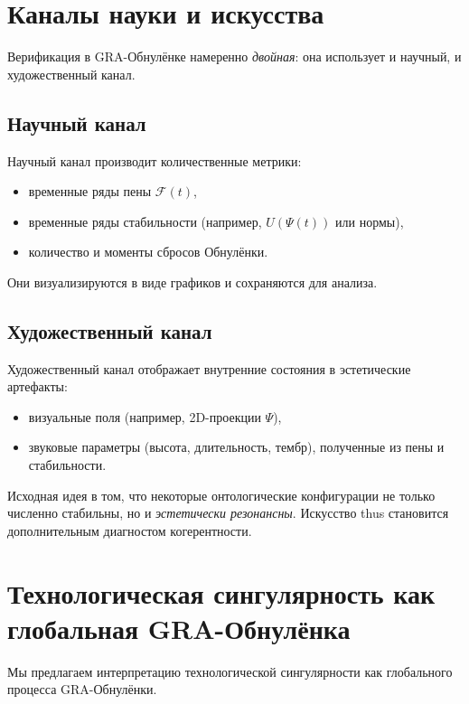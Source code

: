 \documentclass[11pt,a4paper]{article}
\begin{document}
\section{Каналы науки и искусства}
Верификация в GRA-Обнулёнке намеренно \emph{двойная}:
она использует и научный, и художественный канал.

\subsection{Научный канал}
Научный канал производит количественные метрики:
\begin{itemize}
  \item временные ряды пены $\mathcal{F}(t)$,
  \item временные ряды стабильности
        (например, $U(\Psi(t))$ или нормы),
  \item количество и моменты сбросов Обнулёнки.
\end{itemize}
Они визуализируются в виде графиков и сохраняются для анализа.

\subsection{Художественный канал}
Художественный канал отображает внутренние состояния
в эстетические артефакты:
\begin{itemize}
  \item визуальные поля (например, 2D-проекции $\Psi$),
  \item звуковые параметры (высота, длительность, тембр),
        полученные из пены и стабильности.
\end{itemize}
Исходная идея в том, что некоторые онтологические конфигурации
не только численно стабильны, но и \emph{эстетически резонансны}.
Искусство thus становится дополнительным диагностом когерентности.

\section{Технологическая сингулярность
        как глобальная GRA-Обнулёнка}
Мы предлагаем интерпретацию технологической сингулярности
как глобального процесса GRA-Обнулёнки.
\end{document}
